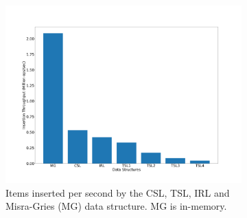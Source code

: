 \begin{figure}
\centering
{
%
\begin{subfigure}{0.33\linewidth}
  \centering
  \includegraphics[width=\linewidth]{../LERT-src/sigmod20_figs/throughput.png}
 \caption{Items inserted per second by the CSL, TSL, IRL and
 Misra-Gries (MG) data structure. MG is in-memory.}
 \label{fig:throughput-data}
\end{subfigure}
\hfill
%
\hfill
\begin{subfigure}{0.32\linewidth}
  \centering
  \captionsetup[subfigure]{justification=centering}

\end{subfigure}}
\end{figure}
